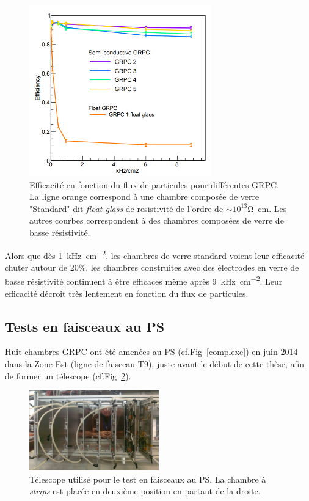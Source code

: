 \begin{figure}[ht!]
	\centering
	\includegraphics[width=0.7\textwidth]{GLA/effiDesy.png}
	\captionsetup{type=figure}\caption{Efficacité en fonction du flux de particules pour différentes GRPC. La ligne orange correspond à une chambre composée de verre "Standard" dit \textit{float glass} de resistivité de l'ordre de $\sim10^{13}$\si{\ohm.\cm}. Les autres courbes correspondent à des chambres composées de verre de basse résistivité.}
	\label{effiDesy}
\end{figure}

Alors que dès \SI{1}{\kilo\hertz\per\square\centi\meter}, les chambres de verre standard voient leur efficacité chuter autour de \num{20}\%, les chambres construites avec des électrodes en verre de basse résistivité continuent à être efficaces même après \SI{9}{\kilo\hertz\per\square\centi\meter}. Leur efficacité décroit très lentement en fonction du flux de particules.

\subsection{Tests en faisceaux au PS}
\label{PSS}
Huit chambres GRPC ont été amenées au PS (cf.Fig~\ref{complexe}) en juin \num{2014} dans la Zone Est (ligne de faisceau T9), juste avant le début de cette thèse, afin de former un télescope (cf.Fig~\ref{TelescopePS}).

\begin{figure}[ht!]
	\centering
	\includegraphics[width=0.50\textwidth]{GLA/TelescopePS.png}
	\captionsetup{type=figure}\caption{Télescope utilisé pour le test en faisceaux au PS. La chambre à \textit{strips} est placée en deuxième position en partant de la droite.}
	\label{TelescopePS}
\end{figure}


